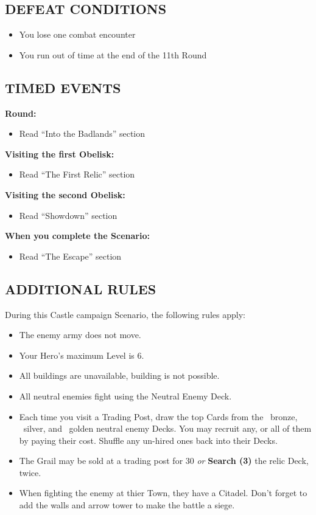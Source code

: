 \begin{multicols}{2}
\subsection*{\MakeUppercase{Defeat Conditions}}
\begin{itemize}
  \item You lose one combat encounter
  \item You run out of time at the end of the 11th Round
\end{itemize}

\subsection*{\MakeUppercase{Timed Events}}

\textbf{ Round:}
\begin{itemize}
  \item Read ``Into the Badlands'' section
\end{itemize}

\textbf{Visiting the first Obelisk:}
\begin{itemize}
  \item Read ``The First Relic'' section
\end{itemize}

\textbf{Visiting the second Obelisk:}
\begin{itemize}
  \item Read ``Showdown'' section
\end{itemize}

\textbf{When you complete the Scenario:}
\begin{itemize}
  \item Read ``The Escape'' section
\end{itemize}

\subsection*{\MakeUppercase{Additional rules}}

During this Castle campaign Scenario, the following rules apply:

\begin{itemize}
  \item The enemy army does not move.
  \item Your Hero's maximum Level is 6.
  \item All buildings are unavailable, building is not possible.
  \item All neutral enemies fight using the Neutral Enemy Deck.
  \item Each time you visit a Trading Post, draw the top Cards from the \bronze\ bronze, \silver\ silver, and \golden\ golden neutral enemy Decks.
    You may recruit any, or all of them by paying their cost.
    Shuffle any un-hired ones back into their Decks.
  \item The Grail may be sold at a trading post for 30  \textit{or} \textbf{Search (3)} the relic Deck, twice.
  \item When fighting the enemy at thier Town, they have a Citadel.
    Don't forget to add the walls and arrow tower to make the battle a siege.
\end{itemize}


\end{multicols}
